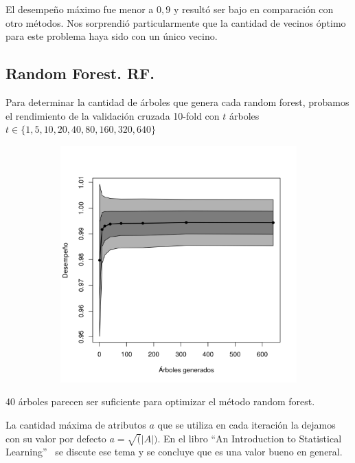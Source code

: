 \documentclass[a4paper,10pt]{article}
\begin{document}
El desempeño m\'aximo fue menor a $0,9$ y result\'o ser bajo en comparaci\'on con otro m\'etodos. Nos sorprendi\'o particularmente que la cantidad de vecinos \'optimo para este problema haya sido con un \'unico vecino. 

\subsection{Random Forest. RF.}

Para determinar la cantidad de \'arboles que genera cada random forest, probamos el rendimiento de la validaci\'on cruzada 10-fold con $t$ \'arboles $t \in \{1,5,10,20,40,80,160,320,640\}$

\begin{figure}[H]
  \centering
  \begin{subfigure}[b]{0.4\textwidth}
    \includegraphics[width=\textwidth]{../imagenes/rf_estimators}
     
  \end{subfigure}
   \caption{}
  \label{fig:rf_estimators}
\end{figure}

40 \'arboles parecen ser suficiente para optimizar el m\'etodo random forest.  

La cantidad m\'axima de atributos $a$ que se utiliza en cada iteraci\'on la dejamos con su valor por defecto $a = \sqrt(|A|)$. En el libro ``An Introduction to Statistical Learning''~\cite{james_hastie_tibshirani} se discute ese tema y se concluye que es una valor bueno en general. 
\end{document}
